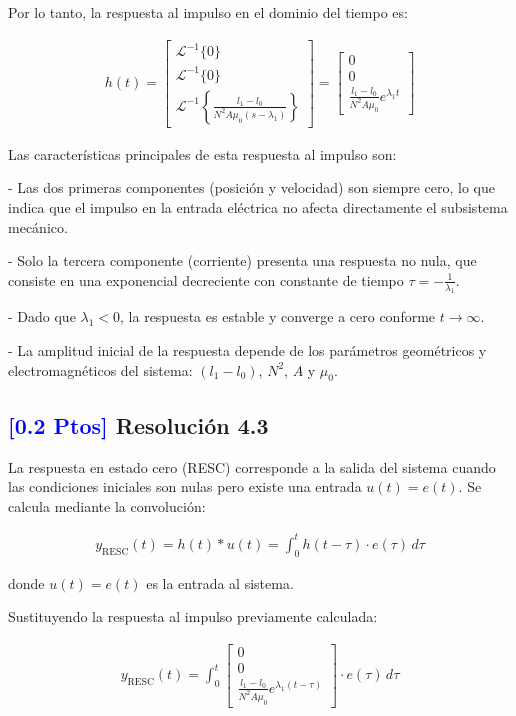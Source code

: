 \documentclass[
  11pt,
  letterpaper,
   addpoints,
   answers
  ]{exam}
\begin{document}
\begin{solution}
Por lo tanto, la respuesta al impulso en el dominio del tiempo es:

\begin{align}
h(t) = \begin{bmatrix}
\mathcal{L}^{-1}\{0\} \\
\mathcal{L}^{-1}\{0\} \\
\mathcal{L}^{-1}\left\{\frac{l_1 - l_0}{N^2A\mu_0(s - \lambda_1)}\right\}
\end{bmatrix} = \begin{bmatrix}
0 \\
0 \\
\frac{l_1 - l_0}{N^2A\mu_0} e^{\lambda_1 t}
\end{bmatrix}
\end{align}

Las características principales de esta respuesta al impulso son:

- Las dos primeras componentes (posición y velocidad) son siempre cero, lo que indica que el impulso en la entrada eléctrica no afecta directamente el subsistema mecánico.

- Solo la tercera componente (corriente) presenta una respuesta no nula, que consiste en una exponencial decreciente con constante de tiempo $\tau = -\frac{1}{\lambda_1}$.

- Dado que $\lambda_1 < 0$, la respuesta es estable y converge a cero conforme $t \to \infty$.

- La amplitud inicial de la respuesta depende de los parámetros geométricos y electromagnéticos del sistema: $(l_1 - l_0)$, $N^2$, $A$ y $\mu_0$.

\subsection*{\textcolor{blue}{[0.2 Ptos]} Resolución 4.3}

La respuesta en estado cero (RESC) corresponde a la salida del sistema cuando las condiciones iniciales son nulas pero existe una entrada $u(t) = e(t)$. Se calcula mediante la convolución:

\begin{align}
y_{\text{RESC}}(t) = h(t) * u(t) = \int_0^t h(t-\tau) \cdot e(\tau) \, d\tau
\end{align}

donde $u(t) = e(t)$ es la entrada al sistema.

Sustituyendo la respuesta al impulso previamente calculada:

\begin{align}
y_{\text{RESC}}(t) = \int_0^t \begin{bmatrix}
0 \\
0 \\
\frac{l_1 - l_0}{N^2A\mu_0} e^{\lambda_1(t-\tau)}
\end{bmatrix} \cdot e(\tau) \, d\tau
\end{align}


\end{solution}
\end{document}
